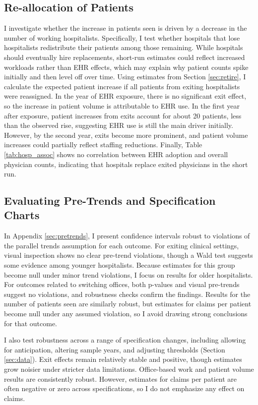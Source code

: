 \documentclass[12pt]{article}
\begin{document}
\subsection{Re-allocation of Patients}

I investigate whether the increase in patients seen is driven by a decrease in the number of working hospitalists. Specifically, I test whether hospitals that lose hospitalists redistribute their patients among those remaining. While hospitals should eventually hire replacements, short-run estimates could reflect increased workloads rather than EHR effects, which may explain why patient counts spike initially and then level off over time. Using estimates from Section \ref{sec:retire}, I calculate the expected patient increase if all patients from exiting hospitalists were reassigned. In the year of EHR exposure, there is no significant exit effect, so the increase in patient volume is attributable to EHR use. In the first year after exposure, patient increases from exits account for about 20 patients, less than the observed rise, suggesting EHR use is still the main driver initially. However, by the second year, exits become more prominent, and patient volume increases could partially reflect staffing reductions. Finally, Table \ref{tab:hosp_assoc} shows no correlation between EHR adoption and overall physician counts, indicating that hospitals replace exited physicians in the short run.


\subsection{Evaluating Pre-Trends and Specification Charts}

In Appendix \ref{sec:pretrends}, I present confidence intervals robust to violations of the parallel trends assumption for each outcome. For exiting clinical settings, visual inspection shows no clear pre-trend violations, though a Wald test suggests some evidence among younger hospitalists. Because estimates for this group become null under minor trend violations, I focus on results for older hospitalists. For outcomes related to switching offices, both p-values and visual pre-trends suggest no violations, and robustness checks confirm the findings. Results for the number of patients seen are similarly robust, but estimates for claims per patient become null under any assumed violation, so I avoid drawing strong conclusions for that outcome.

I also test robustness across a range of specification changes, including allowing for anticipation, altering sample years, and adjusting thresholds (Section \ref{sec:data}). Exit effects remain relatively stable and positive, though estimates grow noisier under stricter data limitations. Office-based work and patient volume results are consistently robust. However, estimates for claims per patient are often negative or zero across specifications, so I do not emphasize any effect on claims.
\end{document}
